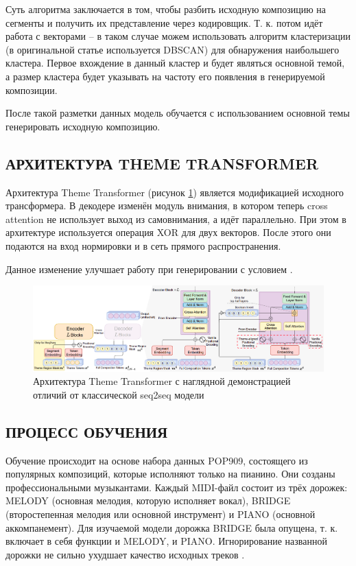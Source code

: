     Суть алгоритма заключается в том, чтобы разбить исходную композицию на сегменты и получить их представление через кодировщик. Т. к. потом идёт работа с векторами -- в таком случае можем использовать алгоритм кластеризации (в оригинальной статье используется DBSCAN) для обнаружения наибольшего кластера. Первое вхождение в данный кластер и будет являться основной темой, а размер кластера будет указывать на частоту его появления в генерируемой композиции.
    
    После такой разметки данных модель обучается с использованием основной темы генерировать исходную композицию.
    
    \subsection{АРХИТЕКТУРА THEME TRANSFORMER}
    Архитектура Theme Transformer (рисунок \ref{fig:theme_transformer}) является модификацией исходного трансформера.
    В декодере изменён модуль внимания, в котором теперь cross attention не использует выход из самовнимания, а идёт параллельно. 
    При этом в архитектуре используется операция XOR для двух векторов. 
    После этого они подаются на вход нормировки и в сеть прямого распространения.
    
    Данное изменение улучшает работу при генерировании с условием \cite{theme}. 
    \begin{figure}[h]
        \centering
        \includegraphics[scale=0.3]{tex/png/theme_transformer.png}
        \caption{Архитектура Theme Transformer с наглядной демонстрацией отличий от классической seq2seq модели \cite{theme}}
        \label{fig:theme_transformer}
    \end{figure}
    
    \subsection{ПРОЦЕСС ОБУЧЕНИЯ}
    
    Обучение происходит на основе набора данных POP909, состоящего из популярных композиций, которые исполняют только на пианино. Они созданы профессиональными музыкантами. Каждый MIDI-файл состоит из трёх дорожек: MELODY (основная мелодия, которую исполняет вокал), BRIDGE (второстепенная мелодия или основной инструмент) и PIANO (основной аккомпанемент). Для изучаемой модели дорожка BRIDGE была опущена, т. к. включает в себя функции и MELODY, и PIANO. Игнорирование названной дорожки не сильно ухудшает качество исходных треков \cite{theme}.
    
